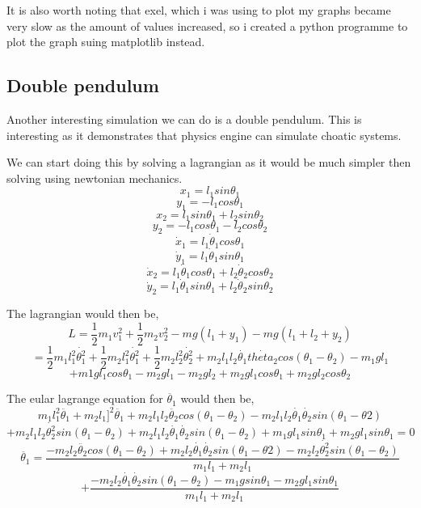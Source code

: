 \documentclass[12pt, a2paper]{article}
\begin{document}
It is also worth noting that exel, which i was using to plot my graphs became very slow as the amount of values increased, so i created a python programme to plot the graph suing matplotlib instead.
\pagebreak

\subsection{Double pendulum}
Another interesting simulation we can do is a double pendulum. This is interesting as it demonstrates that physics engine can simulate choatic systems.

We can start doing this by solving a lagrangian as it would be much simpler then solving using newtonian mechanics.
\[x_{1} = l_{1}sin\theta_{1}\]
\[y_{1} = -l_{1}cos\theta_{1}\]
\[x_{2} = l_{1}sin\theta_{1}+l_{2}sin\theta_{2}\]
\[y_{2} = -l_{1}cos\theta_{1}-l_{2}cos\theta_{2}\]
\[\dot{x}_{1} = l_{1}\dot{\theta}_{1}cos\theta_{1}\]
\[\dot{y}_{1} = l_{1}\dot{\theta}_{1}sin\theta_{1}\]
\[\dot{x}_{2} = l_{1}\dot{\theta}_{1}cos\theta_{1}+l_{2}\dot{\theta}_{2}cos\theta_{2}\]
\[\dot{y}_{2} = l_{1}\dot{\theta}_{1}sin\theta_{1}+l_{2}\dot{\theta}_{2}sin\theta_{2}\]

The lagrangian would then be,
\[L = \frac{1}{2}m_{1}v_{1}^2+\frac{1}{2}m_{2}v_{2}^2-mg(l_{1}+y_{1})-mg(l_{1}+l_{2}+y_{2})\]
\[= \frac{1}{2}m_{1}l_{1}^2\dot{\theta_{1}^2}+\frac{1}{2}m_{2}l_{1}^2\dot{\theta_{1}^2}+\frac{1}{2}m_{2}l_{2}^2\dot{\theta_{2}^2}+m_{2}l_{1}l_{2}\dot{\theta_{1}}\dot{theta_{2}}cos(\theta_{1}-\theta_{2})-m_{1}gl_{1}\]
\[+m{1}gl_{1}cos\theta_{1}-m_{2}gl_{1}-m_{2}gl_{2}+m_{2}gl_{1}cos\theta_{1}+m_{2}gl_{2}cos\theta_{2}\]

The eular lagrange equation for \(\ddot{\theta_{1}}\) would then be,
\[m_{1}l_{1}^2\ddot{\theta_{1}}+m_{2}l_{1}]^2\ddot{\theta_{1}}+m_{2}l_{1}l_{2}\ddot{\theta_{2}}cos(\theta_{1}-\theta_{2})-m_{2}l_{1}l_{2}\dot{\theta_{1}}\dot{\theta_{2}}sin(\theta_{1}-\theta{2})\]
\[+m_{2}l_{1}l_{2}\dot{\theta_{2}^2}sin(\theta_{1}-\theta_{2})+m_{2}l_{1}l_{2}\dot{\theta_{1}}\dot{\theta_{2}}sin(\theta_{1}-\theta_{2})+m_{1}gl_{1}sin\theta_{1}+m_{2}gl_{1}sin\theta_{1} = 0\]
\[\ddot{\theta_{1}} = \frac{-m_{2}l_{2}\ddot{\theta_{2}}cos(\theta_{1}-\theta_{2})+m_{2}l_{2}\dot{\theta_{1}}\dot{\theta_{2}}sin(\theta_{1}-\theta{2})-m_{2}l_{2}\dot{\theta_{2}^2}sin(\theta_{1}-\theta_{2})}{m_{1}l_{1}+m_{2}l_{1}}\]
\[+\frac{-m_{2}l_{2}\dot{\theta_{1}}\dot{\theta_{2}}sin(\theta_{1}-\theta_{2})-m_{1}gsin\theta_{1}-m_{2}gl_{1}sin\theta_{1}}{m_{1}l_{1}+m_{2}l_{1}}\]
\end{document}
